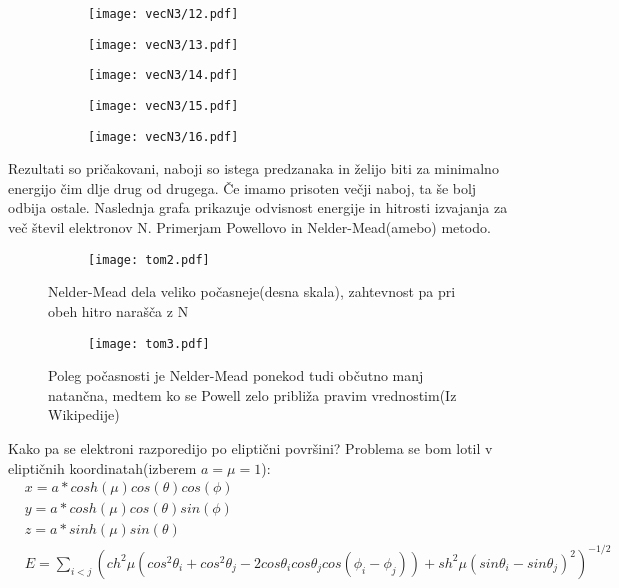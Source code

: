 \documentclass{article}
\begin{document}
\begin{figure}[H]
\centering
\begin{subfigure}{.49\textwidth}
\texttt{[image: vecN3/12.pdf]}
\end{subfigure}
\begin{subfigure}{.49\textwidth}
\texttt{[image: vecN3/13.pdf]}
\end{subfigure}
\end{figure}
\begin{figure}[H]
\centering
\begin{subfigure}{.45\textwidth}
\texttt{[image: vecN3/14.pdf]}
\end{subfigure}
\begin{subfigure}{.45\textwidth}
\texttt{[image: vecN3/15.pdf]}
\end{subfigure}
\begin{subfigure}{.45\textwidth}
\texttt{[image: vecN3/16.pdf]}
\end{subfigure}
\end{figure}

Rezultati so pričakovani, naboji so istega predzanaka in želijo biti za minimalno energijo čim dlje drug od drugega. Če imamo prisoten večji naboj, ta še bolj odbija ostale.
\newpage
Naslednja grafa prikazuje odvisnost energije in hitrosti izvajanja za več števil elektronov N. Primerjam Powellovo in Nelder-Mead(amebo) metodo.

\begin{figure}[H]
\centering
\begin{subfigure}{\textwidth}
\texttt{[image: tom2.pdf]}
\end{subfigure}
\caption*{Nelder-Mead dela veliko počasneje(desna skala), zahtevnost pa pri obeh hitro narašča z N}
\end{figure}

\begin{figure}[H]
\centering
\begin{subfigure}{\textwidth}
\texttt{[image: tom3.pdf]}
\end{subfigure}
\caption*{Poleg počasnosti je Nelder-Mead ponekod tudi občutno manj natančna, medtem ko se Powell zelo približa pravim vrednostim(Iz Wikipedije)}
\end{figure}


Kako pa se elektroni razporedijo po eliptični površini?
Problema se bom lotil v eliptičnih koordinatah(izberem $a=\mu=1$):
\begin{align*}
&x = a*cosh(\mu) cos(\theta) cos(\phi) \\
&y = a*cosh(\mu)cos(\theta)sin(\phi) \\
&z = a*sinh(\mu)sin(\theta) \\
&E = \sum_{i<j} (ch^2\mu(cos^2\theta_i+cos^2\theta_j - 2cos\theta_icos\theta_jcos(\phi_i - \phi_j)) + sh^2\mu(sin\theta_i - sin\theta_j)^2)^{-1/2}
\end{align*}
\end{document}
